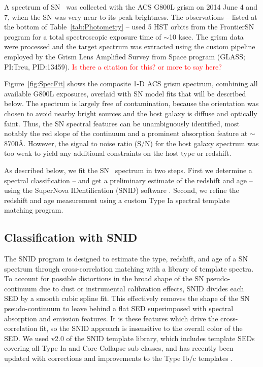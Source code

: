 A spectrum of SN \tomas\ was collected with the ACS G800L grism on
2014 June 4 and 7, when the SN was very near to its peak brightness.
The observations -- listed at the bottom of Table~\ref{tab:Photometry}
-- used 5 HST orbits from the FrontierSN program for a total
spectroscopic exposure time of $\sim$10 ksec.  The grism data were
processed and the target spectrum was extracted using the custom
pipeline employed by the Grism Lens Amplified Survey from Space
program (GLASS; PI:Treu, PID:13459). \textcolor{red}{Is there a
citation for this? or more to say here?}  

Figure~\ref{fig:SpecFit} shows the composite 1-D ACS grism spectrum,
combining all available G800L exposures, overlaid with SN model fits
that will be described below.  The spectrum is largely free of
contamination, because the orientation was chosen to avoid nearby
bright sources and the host galaxy is diffuse and optically faint.
Thus, the SN spectral features can be unambiguously identified, most
notably the red slope of the continuum and a prominent absorption
feature at $\sim$8700\AA.  However, the signal to noise ratio (S/N)
for the host galaxy spectrum was too weak to yield any additional
constraints on the host type or redshift.

As described below, we fit the SN \tomas\ spectrum in two steps.
First we determine a spectral classification -- and get a preliminary
estimate of the redshift and age -- using the SuperNova IDentification
(SNID) software \citep{Blondin:2007}.  Second, we refine the redshift
and age measurement using a custom Type Ia spectral template matching
program.

\subsection{Classification with SNID}
\label{sec:SNID}

The SNID program is designed to estimate the type, redshift, and age
of a SN spectrum through cross-correlation matching with a library of
template spectra.  To account for possible distortions in the broad
shape of the SN pseudo-continuum due to dust or instrumental
calibration effects, SNID divides each SED by a smooth cubic spline
fit. This effectively removes the shape of the SN pseudo-continuum to
leave behind a flat SED superimposed with spectral absorption and
emission features.  It is these features which drive the
cross-correlation fit, so the SNID approach is insensitive to the
overall color of the SED.  We used v2.0 of the SNID template library,
which includes template SEDs covering all Type Ia and Core Collapse
sub-classes, and has recently been updated with corrections and
improvements to the Type Ib/c templates \citep{Liu:2014}.

